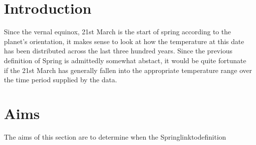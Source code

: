 \documentclass[a4paper,10pt,oneside]{article}
\author{Cameron Robertson}
\date{11/08/17}
\begin{document}
 \section{Introduction}
 \label{sec:intro}
 Since the vernal equinox, 21st March is the start of spring according to the planet's orientation,
 it makes sense to look at how the temperature at this date has been distributed across the last
 three hundred years. Since the previous definition of Spring is admittedly somewhat abstact,
 it would be quite fortunate if the 21st March has generally fallen into the appropriate temperature range
 over the time period supplied by the data. 
 
 \section{Aims}
 \label{sec:aim}
 The aims of this section are to determine when the Spring{linktodefinition}
\end{document}
